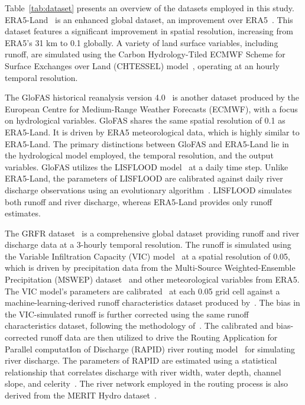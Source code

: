 \documentclass[water,article,submit,pdftex,moreauthors]{Definitions/mdpi}
\begin{document}
Table~\ref{tab:dataset} presents an overview of the datasets employed in this study. ERA5-Land~\citep{munoz-sabater2021ESSD} is an enhanced global dataset, an improvement over ERA5~\citep{hersbach2020QJMRS}. This dataset features a significant improvement in spatial resolution, increasing from ERA5's 31 km to 0.1\textdegree{} globally. A variety of land surface variables, including runoff, are simulated using the Carbon Hydrology-Tiled ECMWF Scheme for Surface Exchanges over Land (CHTESSEL) model~\citep{boussetta2021A, balsamo2009JHM}, operating at an hourly temporal resolution.

The GloFAS historical reanalysis version 4.0~\citep{alfieri2020JH, harrigan2020ESSD} is another dataset produced by the European Centre for Medium-Range Weather Forecasts (ECMWF), with a focus on hydrological variables. GloFAS shares the same spatial resolution of 0.1\textdegree{} as ERA5-Land. It is driven by ERA5 meteorological data, which is highly similar to ERA5-Land. The primary distinctions between GloFAS and ERA5-Land lie in the hydrological model employed, the temporal resolution, and the output variables. GloFAS utilizes the LISFLOOD model~\citep{knijff2010IJGIS} at a daily time step. Unlike ERA5-Land, the parameters of LISFLOOD are calibrated against daily river discharge observations using an evolutionary algorithm~\citep{hirpa2018JH}. LISFLOOD simulates both runoff and river discharge, whereas ERA5-Land provides only runoff estimates.

The GRFR dataset~\citep{yang2021BAMS} is a comprehensive global dataset providing runoff and river discharge data at a 3-hourly temporal resolution. The runoff is simulated using the Variable Infiltration Capacity (VIC) model~\citep{liang1994JGRA} at a spatial resolution of 0.05\textdegree, which is driven by precipitation data from the Multi-Source Weighted-Ensemble Precipitation (MSWEP) dataset~\citep{beck2019BAMS} and other meteorological variables from ERA5. The VIC model's parameters are calibrated~\citep{yang2019WRR} at each 0.05\textdegree{} grid cell against a machine-learning-derived runoff characteristics dataset produced by~\citet{beck2015JHM}. The bias in the VIC-simulated runoff is further corrected using the same runoff characteristics dataset, following the methodology of~\citet{lin2019WRR}. The calibrated and bias-corrected runoff data are then utilized to drive the Routing Application for Parallel computatIon of Discharge (RAPID) river routing model~\citep{david2011JHM} for simulating river discharge. The parameters of RAPID are estimated using a statistical relationship that correlates discharge with river width, water depth, channel slope, and celerity~\citep{lin2019WRR}. The river network employed in the routing process is also derived from the MERIT Hydro dataset~\citep{lin2021SD}.
\end{document}
